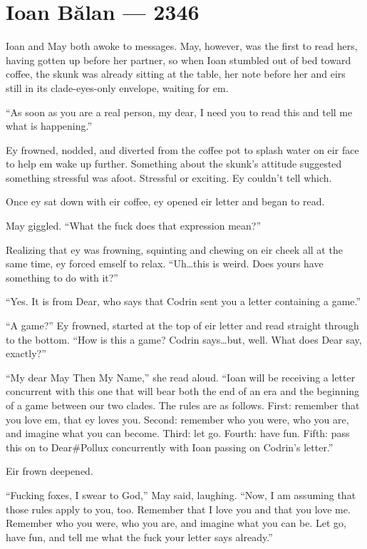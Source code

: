 \hypertarget{ioan-bux103lan-2346}{%
\chapter{Ioan Bălan — 2346}\label{ioan-bux103lan-2346}}

Ioan and May both awoke to messages. May, however, was the first to read hers, having gotten up before her partner, so when Ioan stumbled out of bed toward coffee, the skunk was already sitting at the table, her note before her and eirs still in its clade-eyes-only envelope, waiting for em.

``As soon as you are a real person, my dear, I need you to read this and tell me what is happening.''

Ey frowned, nodded, and diverted from the coffee pot to splash water on eir face to help em wake up further. Something about the skunk's attitude suggested something stressful was afoot. Stressful or exciting. Ey couldn't tell which.

Once ey sat down with eir coffee, ey opened eir letter and began to read.

May giggled. ``What the fuck does that expression mean?''

Realizing that ey was frowning, squinting and chewing on eir cheek all at the same time, ey forced emself to relax. ``Uh\ldots this is weird. Does yours have something to do with it?''

``Yes. It is from Dear, who says that Codrin sent you a letter containing a game.''

``A game?'' Ey frowned, started at the top of eir letter and read straight through to the bottom. ``How is this a game? Codrin says\ldots but, well. What does Dear say, exactly?''

``My dear May Then My Name,'' she read aloud. ``Ioan will be receiving a letter concurrent with this one that will bear both the end of an era and the beginning of a game between our two clades. The rules are as follows. First: remember that you love em, that ey loves you. Second: remember who you were, who you are, and imagine what you can become. Third: let go. Fourth: have fun. Fifth: pass this on to Dear\#Pollux concurrently with Ioan passing on Codrin's letter.''

Eir frown deepened.

``Fucking foxes, I swear to God,'' May said, laughing. ``Now, I am assuming that those rules apply to you, too. Remember that I love you and that you love me. Remember who you were, who you are, and imagine what you can be. Let go, have fun, and tell me what the fuck your letter says already.''

